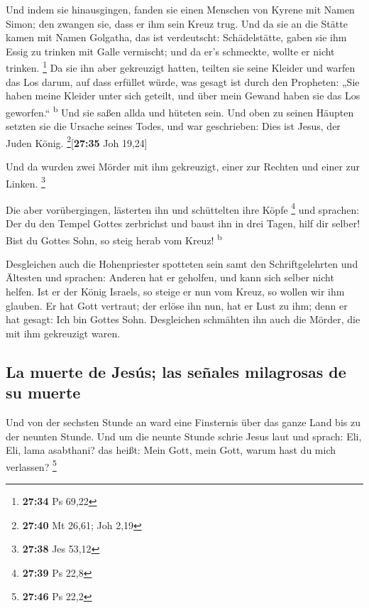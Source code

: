  Und indem sie hinausgingen, fanden sie einen Menschen
von Kyrene mit Namen Simon; den zwangen sie, dass er ihm sein Kreuz
trug.  Und da sie an die Stätte kamen mit Namen Golgatha,
das ist verdeutscht: Schädelstätte,  gaben sie ihm Essig
zu trinken mit Galle vermischt; und da er's schmeckte, wollte er nicht
trinken. \footnote{\textbf{27:34} Ps 69,22}  Da sie ihn
aber gekreuzigt hatten, teilten sie seine Kleider und warfen das Los
darum, auf dass erfüllet würde, was gesagt ist durch den Propheten: „Sie
haben meine Kleider unter sich geteilt, und über mein Gewand haben sie
das Los geworfen.`` \textsuperscript{b}  Und sie saßen
allda und hüteten sein.  Und oben zu seinen Häupten
setzten sie die Ursache seines Todes, und war geschrieben: Dies ist
Jesus, der Juden König. \footnote{\textbf{27:40} Mt 26,61; Joh 2,19}{[}\textbf{27:35}
Joh 19,24{]}

 Und da wurden zwei Mörder mit ihm gekreuzigt, einer zur
Rechten und einer zur Linken. \footnote{\textbf{27:38} Jes 53,12}

 Die aber vorübergingen, lästerten ihn und schüttelten
ihre Köpfe \footnote{\textbf{27:39} Ps 22,8}  und
sprachen: Der du den Tempel Gottes zerbrichst und baust ihn in drei
Tagen, hilf dir selber! Bist du Gottes Sohn, so steig herab vom Kreuz!
\textsuperscript{b}

 Desgleichen auch die Hohenpriester spotteten sein samt
den Schriftgelehrten und Ältesten und sprachen:  Anderen
hat er geholfen, und kann sich selber nicht helfen. Ist er der König
Israels, so steige er nun vom Kreuz, so wollen wir ihm glauben.
 Er hat Gott vertraut; der erlöse ihn nun, hat er Lust zu
ihm; denn er hat gesagt: Ich bin Gottes Sohn. 
Desgleichen schmähten ihn auch die Mörder, die mit ihm gekreuzigt waren.

\hypertarget{la-muerte-de-jesuxfas-las-seuxf1ales-milagrosas-de-su-muerte}{%
\subsection{La muerte de Jesús; las señales milagrosas de su
muerte}\label{la-muerte-de-jesuxfas-las-seuxf1ales-milagrosas-de-su-muerte}}

 Und von der sechsten Stunde an ward eine Finsternis über
das ganze Land bis zu der neunten Stunde.  Und um die
neunte Stunde schrie Jesus laut und sprach: Eli, Eli, lama asabthani?
das heißt: Mein Gott, mein Gott, warum hast du mich verlassen?
\footnote{\textbf{27:46} Ps 22,2}

